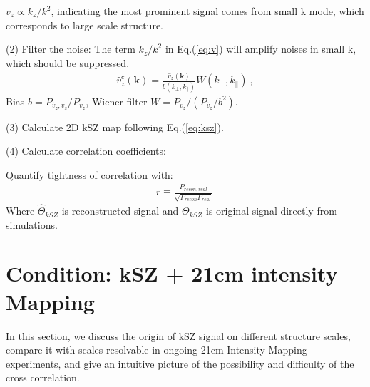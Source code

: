 \documentclass[aps,prd,twocolumn,showpacs,superscriptaddress,groupedaddress,nofootinbib]{revtex4}  %
\begin{document}
$v_z \propto k_z/k^2$, indicating the most prominent signal comes from small k mode, which corresponds to large scale structure. 

(2) Filter the noise: 
The term $k_z/k^2$ in Eq.(\ref{eq:v}) will amplify noises in small k, 
which should be suppressed. 
\begin{eqnarray}
	\label{eq:wienerv}
\hat v_z^c(\bm{k})=\frac{\hat v_z(\bm{k})}{b(k_\perp,k_\parallel)}W(k_\perp,k_\parallel)\ ,
\end{eqnarray}
Bias $b=P_{\hat v_z,v_z}/P_{v_z}$, Wiener filter $W=P_{v_z}/(P_{\hat v_z}/b^2)$.

(3) Calculate 2D kSZ map following Eq.(\ref{eq:ksz}).

(4) Calculate correlation coefficients:

Quantify tightness of correlation with: 
\begin{eqnarray}
	r\equiv \frac{P_{recon,real}}{\sqrt{P_{recon}P_{real}}}\,
\end{eqnarray}
Where $\hat \Theta_{kSZ}$ is reconstructed signal 
and $\Theta_{kSZ}$ is original signal directly from simulations.


\section{Condition: kSZ + 21cm intensity Mapping}
In this section, we discuss the origin of kSZ signal 
on different structure scales, 
compare it with scales resolvable in 
ongoing 21cm Intensity Mapping experiments, 
and give an intuitive picture of the possibility and
 difficulty of the cross correlation.
\end{document}
